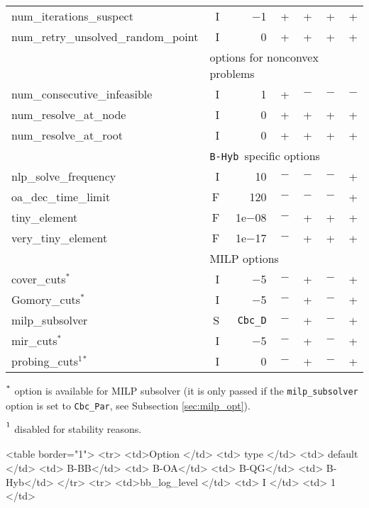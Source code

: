 {\begin{latexonly}
\begin{threeparttable}
\begin{tabular}{|l|r|r|r|r|r|r|}
num\_iterations\_suspect & I & $-$1 & + & + & + & + \\
num\_retry\_unsolved\_random\_point & I & 0 & + & + & + & + \\
\hline
\multicolumn{1}{|c}{} & \multicolumn{6}{l|}{options for nonconvex problems}\\
\hline
num\_consecutive\_infeasible & I & 1 & + & $-$ & $-$ & $-$\\
num\_resolve\_at\_node & I & 0 & + & +  & + & + \\
num\_resolve\_at\_root & I & 0& + & + & + & +  \\
\hline
\multicolumn{1}{|c}{} & \multicolumn{6}{l|}{{\tt B-Hyb }specific options}\\
\hline
nlp\_solve\_frequency & I & 10 & $-$ & $-$ & $-$ & +\\
oa\_dec\_time\_limit & F& 120 & $-$ & $-$ & $-$ & +\\
tiny\_element & F & 1e$-$08 & $-$ & + & + & + \\
very\_tiny\_element & F & 1e$-$17 & $-$ & + & + & + \\
\hline
\multicolumn{1}{|c}{} & \multicolumn{6}{l|}{MILP options}\\
\hline
cover\_cuts$^*$  & I & $-$5 & $-$ & + & $-$ & +\\
Gomory\_cuts$^*$ & I & $-$5 & $-$ &  + & $-$ & + \\
milp\_subsolver &S & {\tt Cbc\_D} & $-$ & + & $-$ & + \\
mir\_cuts$^*$  & I & $-$5 & $-$  & + & $-$ &+\\
probing\_cuts$^1$$^*$  & I & 0 & $-$ & + & $-$ & +\\
\hline
\end{tabular}
\begin{tablenotes}
\item $\strut^*$ option is available
         for MILP subsolver (it is only passed if the {\tt milp\_subsolver} option is set to {\tt Cbc\_Par},
         see Subsection \ref{sec:milp_opt}).
\item $\strut^1$ disabled for stability reasons.
\end{tablenotes}
\end{threeparttable}
\end{latexonly}
}{
\begin{rawhtml}
<table border="1">
  <tr>
    <td>Option </td>
    <td> type </td>
    <td> default </td>
    <td> B-BB</td>
    <td> B-OA</td>
    <td> B-QG</td>
    <td> B-Hyb</td>
  </tr>
  <tr>
    <td>bb_log_level </td>
    <td> I </td>
    <td> 1 </td>

\end{rawhtml}}
